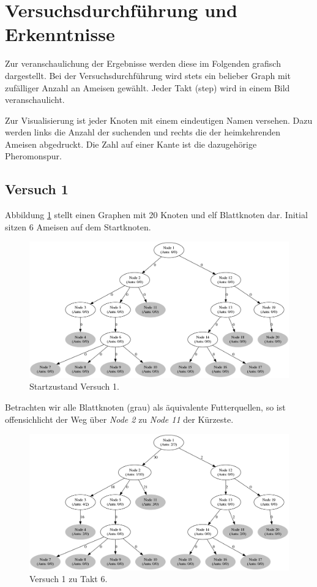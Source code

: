 
\section{Versuchsdurchführung und Erkenntnisse}
\label{sec:versuch}

Zur veranschaulichung der Ergebnisse werden diese im Folgenden grafisch dargestellt.
Bei der Versuchsdurchführung wird stets ein belieber Graph mit zufälliger Anzahl an Ameisen gewählt. Jeder Takt (step) wird in einem Bild veranschaulicht.\par
Zur Visualisierung ist jeder Knoten mit einem eindeutigen Namen versehen.
Dazu werden links die Anzahl der suchenden und rechts die der heimkehrenden Ameisen abgedruckt.
Die Zahl auf einer Kante ist die dazugehörige Pheromonspur.

\subsection{Versuch 1}
Abbildung \ref{fig:v1} stellt einen Graphen mit 20 Knoten und elf Blattknoten dar. Initial sitzen 6 Ameisen auf dem Startknoten.

\begin{figure}[htbp]
	\includegraphics[width=.9\textwidth]{images/v1_1.png}
	\caption{Startzustand Versuch 1.}
	\label{fig:v1}
\end{figure}

Betrachten wir alle Blattknoten (grau) als äquivalente Futterquellen, so ist offensichlicht der Weg über \emph{Node 2} zu \emph{Node 11} der Kürzeste.

\begin{figure}[htbp]
	\includegraphics[width=.9\textwidth]{images/v1_6.png}
	\caption{Versuch 1 zu Takt 6.}
	\label{fig:v1_6}
\end{figure}

